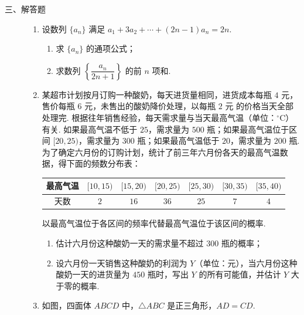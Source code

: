 \begin{description}

    \item[三、解答题]

    \begin{enumerate}[leftmargin=5pt]

      \addtocounter{enumi}{+16}

        \item 设数列 \(\{a_n\}\) 满足 \(a_1+3a_2+\cdots+(2n-1)a_n=2n\).

\begin{enumerate}
\item 求 \(\{a_n\}\) 的通项公式；
\item 求数列 \(\left\{\dfrac{a_n}{2n+1}\right\}\) 的前 \(n\) 项和.
\end{enumerate}

        \item 某超市计划按月订购一种酸奶，每天进货量相同，进货成本每瓶 \(4\text{ 元}\)，售价每瓶 \(6\text{ 元}\)，未售出的酸奶降价处理，以每瓶 \(2\text{ 元}\) 的价格当天全部处理完. 根据往年销售经验，每天需求量与当天最高气温（单位：\(^{\circ}\mathrm{C}\)）有关. 如果最高气温不低于 \(25\)，需求量为 \(500\text{ 瓶}\)；如果最高气温位于区间 \([20,25)\)，需求量为 \(300\text{ 瓶}\)；如果最高气温低于 \(20\)，需求量为 \(200\text{ 瓶}\). 为了确定六月份的订购计划，统计了前三年六月份各天的最高气温数据，得下面的频数分布表：

\begin{center}
\begin{tabular}{c|cccccc}
最高气温 & \([10,15)\) & \([15,20)\) & \([20,25)\) & \([25,30)\) & \([30,35)\) & \([35,40)\) \\
\hline
天数 & \(2\) & \(16\) & \(36\) & \(25\) & \(7\) & \(4\)
\end{tabular}
\end{center}

以最高气温位于各区间的频率代替最高气温位于该区间的概率.

\begin{enumerate}
\item 估计六月份这种酸奶一天的需求量不超过 \(300\) 瓶的概率；
\item 设六月份一天销售这种酸奶的利润为 \(Y\)（单位：元），当六月份这种酸奶一天的进货量为 \(450\) 瓶时，写出 \(Y\) 的所有可能值，并估计 \(Y\) 大于零的概率.
\end{enumerate}

        \item 如图，四面体 \(ABCD\) 中，\(\triangle ABC\) 是正三角形，\(AD=CD\).


\end{enumerate}
\end{description}
